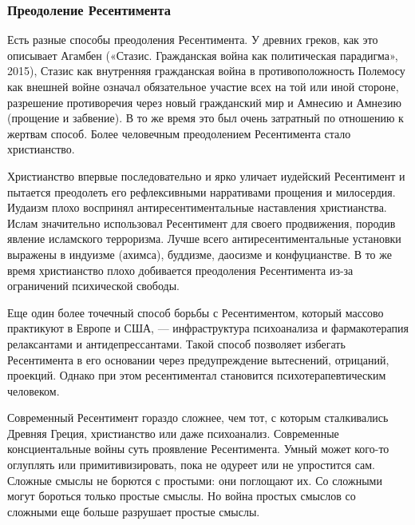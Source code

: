  
 
 
 
 

\subsubsection{Преодоление Ресентимента}

Есть разные способы преодоления Ресентимента. У древних греков, как это
описывает Агамбен («Стазис. Гражданская война как политическая парадигма»,
2015), Стазис как внутренняя гражданская война в противоположность Полемосу как
внешней войне означал обязательное участие всех на той или иной стороне,
разрешение противоречия через новый гражданский мир и Амнесию и Амнезию
(прощение и забвение). В то же время это был очень затратный по отношению к
жертвам способ. Более человечным преодолением Ресентимента стало христианство.

Христианство впервые последовательно и ярко уличает иудейский Ресентимент и
пытается преодолеть его рефлексивными нарративами прощения и милосердия.
Иудаизм плохо воспринял антиресентиментальные наставления христианства. Ислам
значительно использовал Ресентимент для своего продвижения, породив явление
исламского терроризма. Лучше всего антиресентиментальные установки выражены в
индуизме (ахимса), буддизме, даосизме и конфуцианстве. В то же время
христианство плохо добивается преодоления Ресентимента из-за ограничений
психической свободы.

Еще один более точечный способ борьбы с Ресентиментом, который массово
практикуют в Европе и США, — инфраструктура психоанализа и фармакотерапия
релаксантами и антидепрессантами. Такой способ позволяет избегать Ресентимента
в его основании через предупреждение вытеснений, отрицаний, проекций. Однако
при этом ресентиментал становится психотерапевтическим человеком.

Современный Ресентимент гораздо сложнее, чем тот, с которым сталкивались
Древняя Греция, христианство или даже психоанализ. Современные консциентальные
войны суть проявление Ресентимента. Умный может кого-то оглуплять или
примитивизировать, пока не одуреет или не упростится сам. Сложные смыслы не
борются с простыми: они поглощают их. Со сложными могут бороться только простые
смыслы. Но война простых смыслов со сложными еще больше разрушает простые
смыслы.

